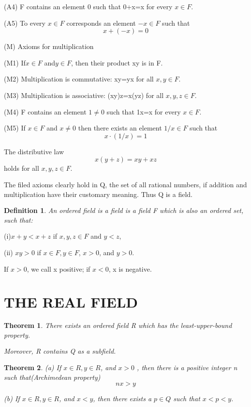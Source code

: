 \documentclass{article}
\newtheorem{defi}{Definition}
\newtheorem{theo}{Theorem}
\begin{document}
(A4) F contains an element 0 such that 0+x=x for every $ x\in F $.

(A5) To every $ x\in F $ corresponds an element $ -x\in F $
such that
\[
x+(-x)=0
\]

\hspace*{\fill}

(M) Axioms for multiplication

(M1) If$ x\in F $ and$ y\in F $, then their product xy is in F.

(M2) Multiplication is commutative: xy=yx for all $ x,y\in F $.

(M3) Multiplication is associative: (xy)z=x(yz) for all $ x,y,z\in F $.

(M4) F contains an element $ 1\ne 0 $ such that 1x=x for every $ x\in F $.

(M5) If $ x\in F $ and $ x\ne 0 $ then there exists an element $ 1/x\in F $ such that
\[
x\cdot(1/x)=1
\]

\hspace*{\fill}

The distributive law
\[x(y+z)=xy+xz\]
holds for all $ x,y,z\in F $.

\hspace*{\fill}

The filed axioms clearly hold in Q, the set of all rational numbers, if addition and multiplication have their customary meaning. Thus Q is a field.

\begin{defi}
	An ordered field is a field is a field F which is also an ordered set, such that:

\end{defi}

(i)$ x+y<x+z$ if $ x,y,z\in F $ and $y<z$,

(ii) $xy>0$ if $ x\in F, y\in F $, $x>0$, and $y>0$.

If $x>0$, we call x positive; if $x<0$, x is negative.

\section{THE REAL FIELD}
\begin{theo}
	There exists an ordered field R which has the least-upper-bound property.

	Moreover, R contains Q as a subfield.
\end{theo}

\begin{theo}
	(a) If $ x\in R, y\in R $, and $x>0$ , then there is a positive integer n such that(Archimedean property)
	\[
	nx>y
	\]

	(b) If $ x\in R,y\in R $, and $x<y$, then there exists a $ p\in Q $ such that $ x<p<y $.
\end{theo}
\end{document}
